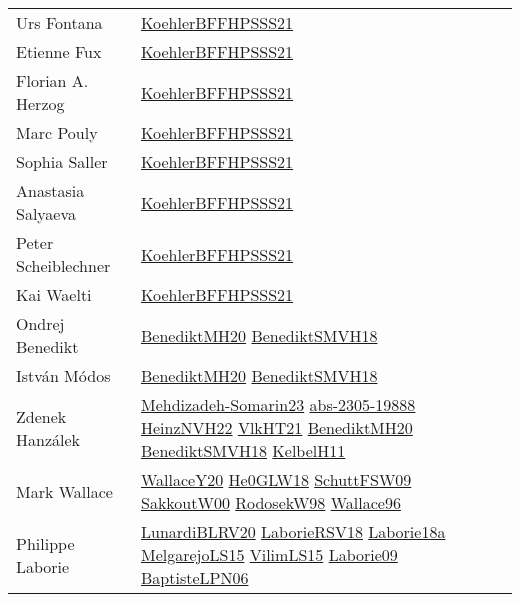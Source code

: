 {\begin{longtable}{p{4cm}p{15cm}}
Urs Fontana & \href{articles/KoehlerBFFHPSSS21.pdf}{KoehlerBFFHPSSS21}\cite{KoehlerBFFHPSSS21} \\
Etienne Fux & \href{articles/KoehlerBFFHPSSS21.pdf}{KoehlerBFFHPSSS21}\cite{KoehlerBFFHPSSS21} \\
Florian A. Herzog & \href{articles/KoehlerBFFHPSSS21.pdf}{KoehlerBFFHPSSS21}\cite{KoehlerBFFHPSSS21} \\
Marc Pouly & \href{articles/KoehlerBFFHPSSS21.pdf}{KoehlerBFFHPSSS21}\cite{KoehlerBFFHPSSS21} \\
Sophia Saller & \href{articles/KoehlerBFFHPSSS21.pdf}{KoehlerBFFHPSSS21}\cite{KoehlerBFFHPSSS21} \\
Anastasia Salyaeva & \href{articles/KoehlerBFFHPSSS21.pdf}{KoehlerBFFHPSSS21}\cite{KoehlerBFFHPSSS21} \\
Peter Scheiblechner & \href{articles/KoehlerBFFHPSSS21.pdf}{KoehlerBFFHPSSS21}\cite{KoehlerBFFHPSSS21} \\
Kai Waelti & \href{articles/KoehlerBFFHPSSS21.pdf}{KoehlerBFFHPSSS21}\cite{KoehlerBFFHPSSS21} \\
Ondrej Benedikt & \href{articles/BenediktMH20.pdf}{BenediktMH20}\cite{BenediktMH20} \href{papers/BenediktSMVH18.pdf}{BenediktSMVH18}\cite{BenediktSMVH18} \\
Istv{\'{a}}n M{\'{o}}dos & \href{articles/BenediktMH20.pdf}{BenediktMH20}\cite{BenediktMH20} \href{papers/BenediktSMVH18.pdf}{BenediktSMVH18}\cite{BenediktSMVH18} \\
Zdenek Hanz{\'{a}}lek & \href{papers/Mehdizadeh-Somarin23.pdf}{Mehdizadeh-Somarin23}\cite{Mehdizadeh-Somarin23} \href{articles/abs-2305-19888.pdf}{abs-2305-19888}\cite{abs-2305-19888} \href{articles/HeinzNVH22.pdf}{HeinzNVH22}\cite{HeinzNVH22} \href{articles/VlkHT21.pdf}{VlkHT21}\cite{VlkHT21} \href{articles/BenediktMH20.pdf}{BenediktMH20}\cite{BenediktMH20} \href{papers/BenediktSMVH18.pdf}{BenediktSMVH18}\cite{BenediktSMVH18} \href{articles/KelbelH11.pdf}{KelbelH11}\cite{KelbelH11} \\
Mark Wallace & \href{articles/WallaceY20.pdf}{WallaceY20}\cite{WallaceY20} \href{papers/He0GLW18.pdf}{He0GLW18}\cite{He0GLW18} \href{papers/SchuttFSW09.pdf}{SchuttFSW09}\cite{SchuttFSW09} \href{articles/SakkoutW00.pdf}{SakkoutW00}\cite{SakkoutW00} \href{papers/RodosekW98.pdf}{RodosekW98}\cite{RodosekW98} \href{articles/Wallace96.pdf}{Wallace96}\cite{Wallace96} \\
Philippe Laborie & \href{articles/LunardiBLRV20.pdf}{LunardiBLRV20}\cite{LunardiBLRV20} \href{articles/LaborieRSV18.pdf}{LaborieRSV18}\cite{LaborieRSV18} \href{papers/Laborie18a.pdf}{Laborie18a}\cite{Laborie18a} \href{papers/MelgarejoLS15.pdf}{MelgarejoLS15}\cite{MelgarejoLS15} \href{papers/VilimLS15.pdf}{VilimLS15}\cite{VilimLS15} \href{papers/Laborie09.pdf}{Laborie09}\cite{Laborie09} \href{}{BaptisteLPN06}\cite{BaptisteLPN06} \\

\end{longtable}}
